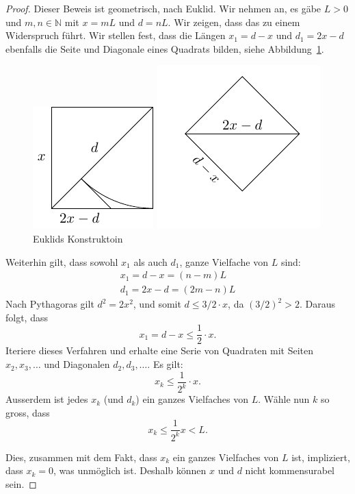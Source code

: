 \documentclass[../main.tex]{subfiles}
\begin{document}
\begin{proof}
  Dieser Beweis ist geometrisch, nach Euklid. Wir nehmen an, es gäbe $L > 0$ und
  $m,n \in \mathbb N$ mit $x = mL$ und $d = nL$. Wir zeigen, dass das zu einem Widerspruch
  führt.
  Wir stellen fest, dass die Längen $x_{1} = d-x$ und $d_{1} = 2x - d$
  ebenfalls die Seite und Diagonale eines Quadrats bilden, siehe
  Abbildung~\ref{fig:euklid}.

  \begin{figure}[htb]
    \centering
    \begin{minipage}{0.4\linewidth}
      \centering
      \includegraphics{images/euklid-quadrat}
    \end{minipage}%
    \begin{minipage}{0.4\linewidth}
      \centering
      \includegraphics{images/euklid-quadrat2}
    \end{minipage}
    \caption{Euklids Konstruktoin}%
    \label{fig:euklid}
  \end{figure}

  Weiterhin gilt, dass sowohl $x_{1}$ als auch $d_{1}$, ganze Vielfache von $L$ sind:
  \begin{align*}
    x_{1} = d-x = (n-m)L \\
    d_{1} = 2x-d = (2m -n)L
  \end{align*}
  Nach Pythagoras gilt $d^{2} = 2x^{2}$, und somit $d \leq 3/2\cdot x$, da ${(3/2)}^{2} > 2$.
  Daraus folgt, dass
  \[x_{1} = d - x \leq \frac{1}{2} \cdot x.\]
  Iteriere dieses Verfahren und erhalte eine Serie von Quadraten mit Seiten
  $x_{2}, x_{3}, \dots$ und Diagonalen $d_{2}, d_{3}, \dots$. Es gilt:
  \[x_{k} \leq \frac{1}{2^{k}} \cdot x.\]
  Ausserdem ist jedes $x_{k}$ (und $d_{k}$) ein ganzes Vielfaches von $L$.
  Wähle nun $k$ so gross, dass
   \[x_{k} \leq \frac{1}{2^{k}} x < L.\]

   Dies, zusammen mit dem Fakt, dass
   $x_{k}$ ein ganzes Vielfaches von $L$ ist,
   impliziert, dass $x_{k} = 0$, was unmöglich ist. Deshalb können $x$ und $d$
   nicht kommensurabel sein.
\end{proof}
\end{document}
